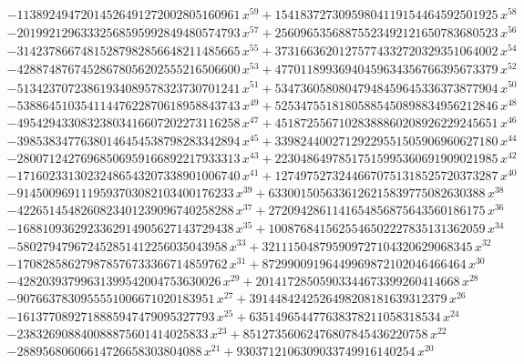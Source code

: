 \documentclass[a4paper,twoside]{article}
\begin{document}
\begin{tiny}
$$\begin{array}{l}
-11389249472014526491272002805160961\,{x}^{59}+15418372730959804119154464592501925\,{x}^{58}\\
-20199212963332568595992849480574793\,{x}^{57}+25609653568875523492121650783680523\,{x}^{56}\\
-31423786674815287982856648211485665\,{x}^{55}+37316636201275774332720329351064002\,{x}^{54}\\
-42887487674528678056202555216506600\,{x}^{53}+47701189936940459634356766395673379\,{x}^{52}\\
-51342370723861934089578323730701241\,{x}^{51}+53473605808047948459645336373877904\,{x}^{50}\\
-53886451035411447622870618958843743\,{x}^{49}+52534755181805885450898834956212846\,{x}^{48}\\
-49542943308323803416607202273116258\,{x}^{47}+45187255671028388860208926229245651\,{x}^{46}\\
-39853834776380146454538798283342894\,{x}^{45}+33982440027129229551505906960627180\,{x}^{44}\\
-28007124276968506959166892217933313\,{x}^{43}+22304864978517515995360691909021985\,{x}^{42}\\
-17160233130232486543207338901006740\,{x}^{41}+12749752732446670751318525720373287\,{x}^{40}\\
-9145009691119593703082103400176233\,{x}^{39}+6330015056336126215839775082630388\,{x}^{38}\\
-4226514548260823401239096740258288\,{x}^{37}+2720942861141654856875643560186175\,{x}^{36}\\
-1688109362923362914905627143729438\,{x}^{35}+1008768415625546502227835131362059\,{x}^{34}\\
-580279479672452851412256035043958\,{x}^{33}+321115048795909727104320629068345\,{x}^{32}\\
-170828586279878576733366714859762\,{x}^{31}+87299009196449969872102046466464\,{x}^{30}\\
-42820393799631399542004753630026\,{x}^{29}+20141728505903344673399260414668\,{x}^{28}\\
-9076637830955551006671020183951\,{x}^{27}+3914484242526498208181639312379\,{x}^{26}\\
-1613770892718885947479095327793\,{x}^{25}+635149654477638378211058318534\,{x}^{24}\\
-238326908840088875601414025833\,{x}^{23}+85127356062476807845436220758\,{x}^{22}\\
-28895680606614726658303804088\,{x}^{21}+9303712106309033749916140254\,{x}^{20}\\

\end{array}$$
\end{tiny}
\end{document}
